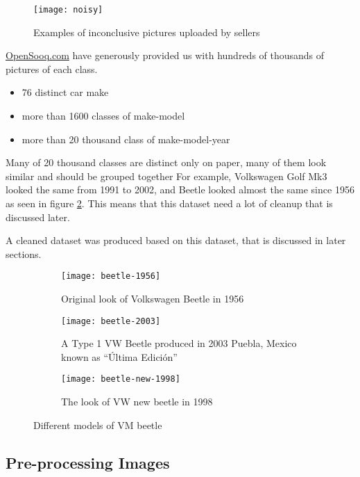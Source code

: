 \begin{figure}[!h]
\centering
\texttt{[image: noisy]}
\caption{Examples of inconclusive pictures uploaded by sellers}\label{fig:noisy}
\end{figure}

\href{http://opensooq.com}{OpenSooq.com} have generously provided us with hundreds of thousands of pictures of each class.

\begin{itemize}
\item 76 distinct car make
\item more than 1600 classes of make-model
\item more than 20 thousand class of make-model-year
\end{itemize}

Many of 20 thousand classes are distinct only on paper, many of them look similar and should be grouped together
For example, Volkswagen Golf Mk3 looked the same from 1991 to 2002, and Beetle looked almost the same since 1956
as seen in figure \ref{fig:beetle}.
This means that this dataset need a lot of cleanup that is discussed later.

A cleaned dataset was produced based on this dataset, that is discussed in later sections.

\begin{figure}[!htbp]
\centering
    \begin{subfigure}[t]{0.48\textwidth}
        \centering
        \texttt{[image: beetle-1956]}
        \caption{Original look of Volkswagen Beetle in 1956}
    \end{subfigure}
    \begin{subfigure}[t]{0.48\textwidth}
        \centering
        \texttt{[image: beetle-2003]}
        \caption{A Type 1 VW Beetle produced in 2003 Puebla, Mexico known as ``Última Edición''}
    \end{subfigure}
    \begin{subfigure}[b]{\textwidth}
        \centering
        \texttt{[image: beetle-new-1998]}
        \caption{The look of VW new beetle in 1998}
    \end{subfigure}
\caption{Different models of VM beetle}\label{fig:beetle}
\end{figure}

\subsection{Pre-processing Images}

